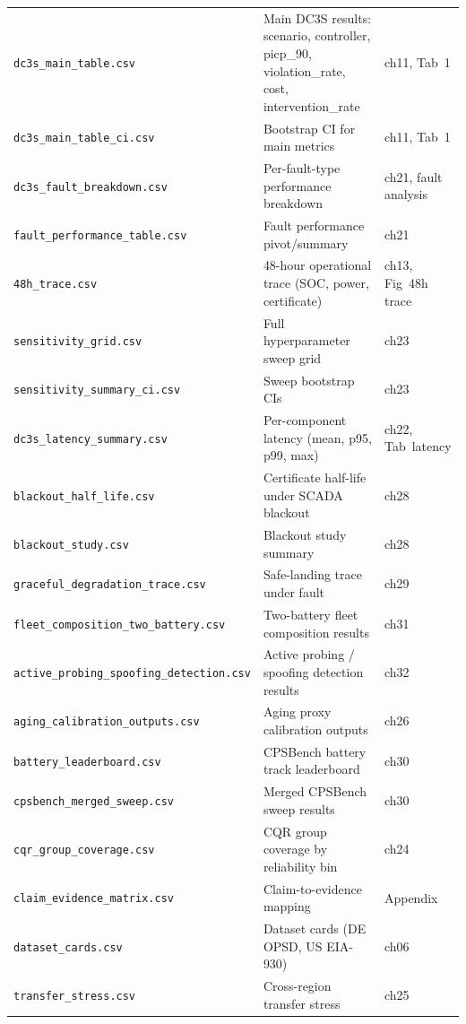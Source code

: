 \begin{small}
\begin{longtable}{@{}p{3.8cm}p{4.2cm}p{3.2cm}@{}}
\texttt{dc3s\_main\_table.csv} & Main DC3S results: scenario, controller, picp\_90, violation\_rate, cost, intervention\_rate & ch11, Tab~1 \\
\texttt{dc3s\_main\_table\_ci.csv} & Bootstrap CI for main metrics & ch11, Tab~1 \\
\texttt{dc3s\_fault\_breakdown.csv} & Per-fault-type performance breakdown & ch21, fault analysis \\
\texttt{fault\_performance\_table.csv} & Fault performance pivot/summary & ch21 \\
\texttt{48h\_trace.csv} & 48-hour operational trace (SOC, power, certificate) & ch13, Fig~48h trace \\
\texttt{sensitivity\_grid.csv} & Full hyperparameter sweep grid & ch23 \\
\texttt{sensitivity\_summary\_ci.csv} & Sweep bootstrap CIs & ch23 \\
\texttt{dc3s\_latency\_summary.csv} & Per-component latency (mean, p95, p99, max) & ch22, Tab~latency \\
\texttt{blackout\_half\_life.csv} & Certificate half-life under SCADA blackout & ch28 \\
\texttt{blackout\_study.csv} & Blackout study summary & ch28 \\
\texttt{graceful\_degradation\_trace.csv} & Safe-landing trace under fault & ch29 \\
\texttt{fleet\_composition\_two\_battery.csv} & Two-battery fleet composition results & ch31 \\
\texttt{active\_probing\_spoofing\_detection.csv} & Active probing / spoofing detection results & ch32 \\
\texttt{aging\_calibration\_outputs.csv} & Aging proxy calibration outputs & ch26 \\
\texttt{battery\_leaderboard.csv} & CPSBench battery track leaderboard & ch30 \\
\texttt{cpsbench\_merged\_sweep.csv} & Merged CPSBench sweep results & ch30 \\
\texttt{cqr\_group\_coverage.csv} & CQR group coverage by reliability bin & ch24 \\
\texttt{claim\_evidence\_matrix.csv} & Claim-to-evidence mapping & Appendix \\
\texttt{dataset\_cards.csv} & Dataset cards (DE OPSD, US EIA-930) & ch06 \\
\texttt{transfer\_stress.csv} & Cross-region transfer stress & ch25 \\
\end{longtable}
\end{small}

